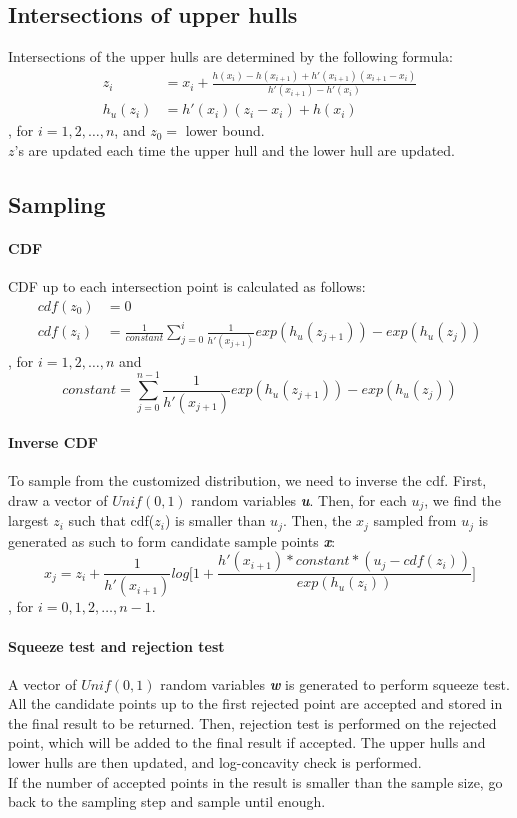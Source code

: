 \documentclass{article}\usepackage[]{graphicx}\usepackage[]{color}
\begin{document}
\subsection{Intersections of upper hulls}
Intersections of the upper hulls are determined by the following formula:\\
\begin{align*}
z_i &= x_i + \frac{h(x_i) - h(x_{i+1}) + h'(x_{i+1})(x_{i+1} - x_i)}{h'(x_{i+1}) - h'(x_i)}\\
h_u(z_i) &= h'(x_i)(z_i - x_i) + h(x_i)
\end{align*}
, for $i = 1, 2, \dots, n$, and $z_0 = $ lower bound.\\
$z$'s are updated each time the upper hull and the lower hull are updated.

\subsection{Sampling}
\paragraph{CDF}
CDF up to each intersection point is calculated as follows:\\
\begin{align*}
cdf(z_0) &= 0\\
cdf(z_i) &= \frac{1}{constant}\sum_{j = 0}^{i} \frac{1}{h'(x_{j+1})}{exp(h_u(z_{j+1})) - exp(h_u(z_{j}))}
\end{align*}
, for $i = 1, 2, \dots, n$ and 
$$constant = \sum_{j = 0}^{n-1} \frac{1}{h'(x_{j+1})}{exp(h_u(z_{j+1})) - exp(h_u(z_{j}))}$$
\paragraph{Inverse CDF}
To sample from the customized distribution, we need to inverse the cdf. First, 
draw a vector of $Unif(0,1)$ random variables \textbf{\textit{u}}. Then, for each 
$u_j$, we find the largest $z_i$ such that cdf($z_i$) is smaller than $u_j$. Then,
the $x_j$ sampled from $u_j$ is generated as such to form candidate sample
points \textbf{\textit{x}}:\\
\[
x_j = z_i + \frac{1}{h'(x_{i+1})}log \Big[1 + \frac{h'(x_{i+1})*constant*(u_j - cdf(z_i))}{exp(h_u(z_i))} \Big]
\]
, for $i = 0, 1, 2, \dots, n-1$.
\paragraph{Squeeze test and rejection test}
A vector of $Unif(0,1)$ random variables \textbf{\textit{w}} is generated to
perform squeeze test. All the candidate points up to the first rejected point
are accepted and stored in the final result to be returned. Then, rejection test
is performed on the rejected point, which will be added to the final result if 
accepted. The upper hulls and lower hulls are then updated, and log-concavity
check is performed.\\
If the number of accepted points in the result is smaller than the sample size,
go back to the sampling step and sample until enough.
\end{document}
